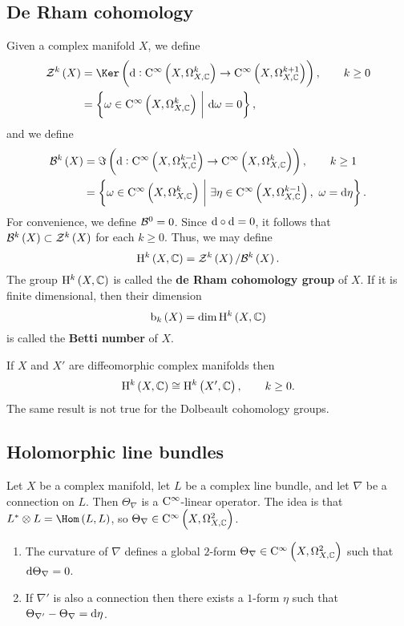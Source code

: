 \pagebreak

\subsection{De Rham cohomology}

Given a complex manifold $ X $, we define
\begin{align*}
\ZZZ^k\br{X}
& = \Ker \br{\d : \C^\infty\br{X, \Omega_{X, \CC}^k} \to \C^\infty\br{X, \Omega_{X, \CC}^{k + 1}}}, \qquad k \ge 0 \\
& = \cbr{\omega \in \C^\infty\br{X, \Omega_{X, \CC}^k} \st \d\omega = 0},
\end{align*}
and we define
\begin{align*}
\BBB^k\br{X}
& = \Im \br{\d : \C^\infty\br{X, \Omega_{X, \CC}^{k - 1}} \to \C^\infty\br{X, \Omega_{X, \CC}^k}}, \qquad k \ge 1 \\
& = \cbr{\omega \in \C^\infty\br{X, \Omega_{X, \CC}^k} \st \exists \eta \in \C^\infty\br{X, \Omega_{X, \CC}^{k - 1}}, \ \omega = \d\eta}.
\end{align*}
For convenience, we define $ \mathcal{B}^0 = 0 $. Since $ \mathrm{d} \circ \mathrm{d} = 0 $, it follows that $ \BBB^k\br{X} \subset \ZZZ^k\br{X} $ for each $ k \ge 0 $. Thus, we may define
$$ \H^k\br{X, \CC} = \ZZZ^k\br{X} / \BBB^k\br{X}. $$
The group $ \H^k\br{X, \CC} $ is called the \textbf{de Rham cohomology group} of $ X $. If it is finite dimensional, then their dimension
$$ \b_k\br{X} = \dim \H^k\br{X, \CC} $$
is called the \textbf{Betti number} of $ X $.

\begin{remark}
If $ X $ and $ X' $ are diffeomorphic complex manifolds then
$$ \H^k\br{X, \CC} \cong \H^k\br{X', \CC}, \qquad k \ge 0. $$
The same result is not true for the Dolbeault cohomology groups.
\end{remark}

\subsection{Holomorphic line bundles}

Let $ X $ be a complex manifold, let $ L $ be a complex line bundle, and let $ \nabla $ be a connection on $ L $. Then $ \Theta_\nabla $ is a $ \mathrm{C}^\infty $-linear operator. The idea is that $ L^* \otimes L = \Hom\br{L, L} $, so $ \Theta_\nabla \in \C^\infty\br{X, \Omega_{X, \CC}^2} $.

\begin{proposition}
\hfill
\begin{enumerate}
\item The curvature of $ \nabla $ defines a global $ 2 $-form $ \Theta_\nabla \in \C^\infty\br{X, \Omega_{X, \CC}^2} $ such that $ \mathrm{d}\Theta_\nabla = 0 $.
\item If $ \nabla' $ is also a connection then there exists a $ 1 $-form $ \eta $ such that $ \Theta_{\nabla'} - \Theta_\nabla = \mathrm{d}\eta $.
\end{enumerate}
\end{proposition}

